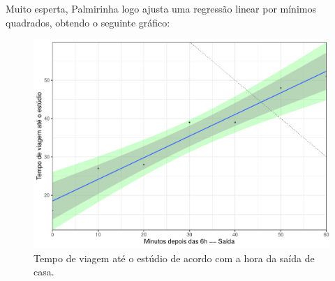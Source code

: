 \documentclass[a4paper,10pt, notitlepage]{report}
\begin{document}
Muito esperta, Palmirinha logo ajusta uma regressão linear por mínimos quadrados, obtendo o seguinte gráfico:
\begin{figure}[!h]
    \centering
    \includegraphics[scale=0.4]{scatter_palmirinha.pdf}
    \caption{Tempo de viagem até o estúdio de acordo com a hora da saída de casa.}
    \label{fig:my_label}
\end{figure}
\end{document}
